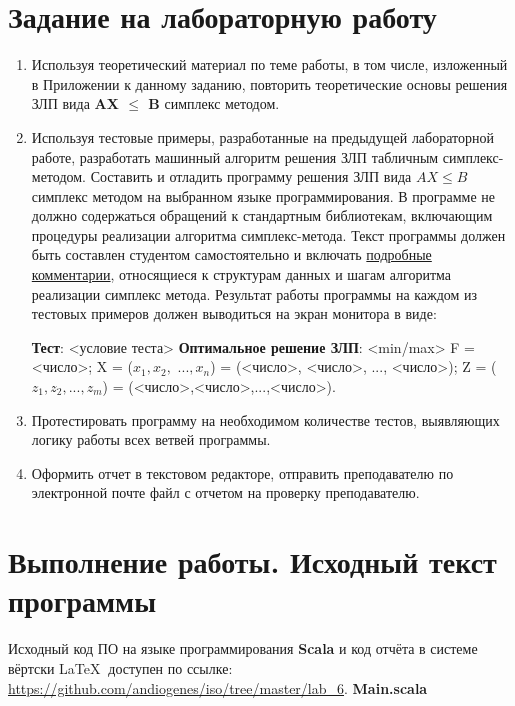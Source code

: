 \documentclass[a4paper,12pt]{article}
\begin{document}


\section{\normalsize{Задание на лабораторную работу}}
\begin{flushleft}
\justify
\begin{enumerate}
\item
Используя теоретический материал по теме работы, в том числе, изложенный в Приложении  к данному заданию, повторить теоретические основы решения ЗЛП вида \textbf{AX $\le$ B} симплекс методом.
\item
    Используя тестовые примеры, разработанные на предыдущей лабораторной работе, разработать машинный алгоритм решения ЗЛП табличным симплекс-методом.\newline
    Составить и отладить программу решения ЗЛП вида $AX \le B$ симплекс методом на выбранном языке программирования. В программе не должно содержаться обращений к стандартным библиотекам, включающим процедуры реализации алгоритма симплекс-метода. Текст программы должен быть составлен студентом самостоятельно и включать \underline{подробные комментарии}, относящиеся к структурам данных и шагам алгоритма реализации симплекс метода.\newline
    Результат работы программы на каждом из тестовых примеров должен выводиться на экран монитора в виде:
    
    \textbf{Тест}: <условие теста>\newline
    \textbf{Оптимальное решение ЗЛП}: <min/max> F = <число>; X = ($x_1, x_2,$ $..., x_n$) = (<число>, <число>, ..., <число>); Z = ($z_1, z_2,$$..., z_m$) = (<число>,<число>,...,<число>).
\item
    Протестировать программу на необходимом количестве тестов, выявляющих логику работы всех ветвей программы.
\item
  Оформить отчет в текстовом редакторе, отправить преподавателю по электронной почте файл с отчетом на проверку преподавателю.
\end{enumerate}
\end{flushleft}

\pagebreak

\section{\normalsize{Выполнение работы. Исходный текст программы}}
\begin{flushleft}
\justify
Исходный код ПО на языке программирования \textbf{Scala} и код отчёта в системе вёртски \LaTeX $~$ доступен по ссылке: \url{https://github.com/andiogenes/iso/tree/master/lab_6}.\newline\linebreak
\textbf{Main.scala}
\inputminted[breaklines]{scala}{../src/main/scala/Main.scala}
\end{flushleft}
\end{document}
